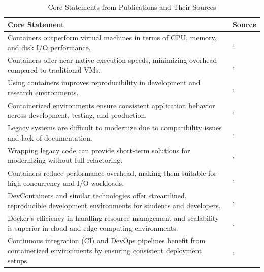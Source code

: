 \begin{table}[htbp]
	\centering
	\begin{tabular}{|p{10cm}|p{4cm}|}
	\hline
	\textbf{Core Statement} & \textbf{Source} \\ \hline
	Containers outperform virtual machines in terms of CPU, memory, and disk I/O performance. & \citet{felterUpdatedPerformanceComparison2015}, \citet{potdarPerformanceEvaluationDocker2020} \\ \hline
	Containers offer near-native execution speeds, minimizing overhead compared to traditional VMs. & \citet{felterUpdatedPerformanceComparison2015}, \citet{sergeevDockerContainerPerformance2022} \\ \hline
	Using containers improves reproducibility in development and research environments. & \citet{citoUsingDockerContainers2016}, \citet{chamberlainUsingDockerSupport2014} \\ \hline
	Containerized environments ensure consistent application behavior across development, testing, and production. & \citet{merkelDockerLightweightLinux2014}, \citet{citoUsingDockerContainers2016} \\ \hline
	Legacy systems are difficult to modernize due to compatibility issues and lack of documentation. & \citet{jhaReusingCodeModernization2005}, \citet{svenssonDefiningIdentifyingLegacy2018} \\ \hline
	Wrapping legacy code can provide short-term solutions for modernizing without full refactoring. & \citet{jhaReusingCodeModernization2005}, \citet{feathersWorkingEffectivelyLegacy2004} \\ \hline
	Containers reduce performance overhead, making them suitable for high concurrency and I/O workloads. & \citet{potdarPerformanceEvaluationDocker2020}, \citet{sergeevDockerContainerPerformance2022} \\ \hline
	DevContainers and similar technologies offer streamlined, reproducible development environments for students and developers. & \citet{valstarUsingDevContainersStandardize2020}, \citet{hungGUIdockUsingDocker2016} \\ \hline
	Docker's efficiency in handling resource management and scalability is superior in cloud and edge computing environments. & \citet{bentalebContainerizationTechnologiesTaxonomies2022}, \citet{koskinenContainersSoftwareDevelopment2019} \\ \hline
	Continuous integration (CI) and DevOps pipelines benefit from containerized environments by ensuring consistent deployment setups. & \citet{agarwalContinuousIntegratedSoftware2018}, \citet{gygiCppBuildLargeScaleAutomatic2021} \\ \hline
	\end{tabular}
	\caption{Core Statements from Publications and Their Sources}
	\label{tab:CoreStatements}
	\end{table}


